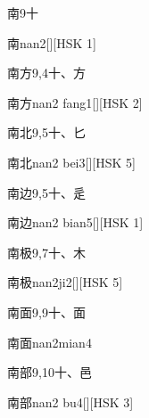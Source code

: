 \begin{entry}{南}{9}{⼗}
  \begin{phonetics}{南}{nan2}[][HSK 1]
  \end{phonetics}
\end{entry}

\begin{entry}{南方}{9,4}{⼗、⽅}
  \begin{phonetics}{南方}{nan2 fang1}[][HSK 2]
  \end{phonetics}
\end{entry}

\begin{entry}{南北}{9,5}{⼗、⼔}
  \begin{phonetics}{南北}{nan2 bei3}[][HSK 5]
  \end{phonetics}
\end{entry}

\begin{entry}{南边}{9,5}{⼗、⾡}
  \begin{phonetics}{南边}{nan2 bian5}[][HSK 1]
  \end{phonetics}
\end{entry}

\begin{entry}{南极}{9,7}{⼗、⽊}
  \begin{phonetics}{南极}{nan2ji2}[][HSK 5]
  \end{phonetics}
\end{entry}

\begin{entry}{南面}{9,9}{⼗、⾯}
  \begin{phonetics}{南面}{nan2mian4}
  \end{phonetics}
\end{entry}

\begin{entry}{南部}{9,10}{⼗、⾢}
  \begin{phonetics}{南部}{nan2 bu4}[][HSK 3]
  \end{phonetics}
\end{entry}

